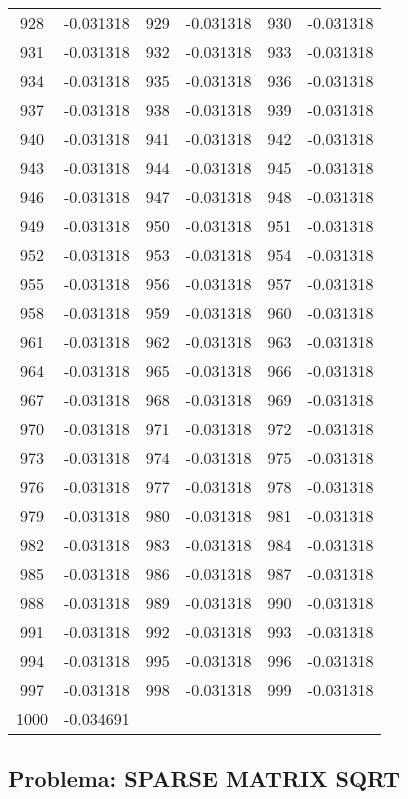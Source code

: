 \documentclass[12pt]{article}
\begin{document}
\begin{longtable}{@{}cc|cc|cc@{}}
928 & -0.031318 & 929 & -0.031318 & 930 & -0.031318 \\
931 & -0.031318 & 932 & -0.031318 & 933 & -0.031318 \\
934 & -0.031318 & 935 & -0.031318 & 936 & -0.031318 \\
937 & -0.031318 & 938 & -0.031318 & 939 & -0.031318 \\
940 & -0.031318 & 941 & -0.031318 & 942 & -0.031318 \\
943 & -0.031318 & 944 & -0.031318 & 945 & -0.031318 \\
946 & -0.031318 & 947 & -0.031318 & 948 & -0.031318 \\
949 & -0.031318 & 950 & -0.031318 & 951 & -0.031318 \\
952 & -0.031318 & 953 & -0.031318 & 954 & -0.031318 \\
955 & -0.031318 & 956 & -0.031318 & 957 & -0.031318 \\
958 & -0.031318 & 959 & -0.031318 & 960 & -0.031318 \\
961 & -0.031318 & 962 & -0.031318 & 963 & -0.031318 \\
964 & -0.031318 & 965 & -0.031318 & 966 & -0.031318 \\
967 & -0.031318 & 968 & -0.031318 & 969 & -0.031318 \\
970 & -0.031318 & 971 & -0.031318 & 972 & -0.031318 \\
973 & -0.031318 & 974 & -0.031318 & 975 & -0.031318 \\
976 & -0.031318 & 977 & -0.031318 & 978 & -0.031318 \\
979 & -0.031318 & 980 & -0.031318 & 981 & -0.031318 \\
982 & -0.031318 & 983 & -0.031318 & 984 & -0.031318 \\
985 & -0.031318 & 986 & -0.031318 & 987 & -0.031318 \\
988 & -0.031318 & 989 & -0.031318 & 990 & -0.031318 \\
991 & -0.031318 & 992 & -0.031318 & 993 & -0.031318 \\
994 & -0.031318 & 995 & -0.031318 & 996 & -0.031318 \\
997 & -0.031318 & 998 & -0.031318 & 999 & -0.031318 \\
1000 & -0.034691 &  &  &  &  \\

\end{longtable}


\newpage            
\subsection{Problema: SPARSE MATRIX SQRT}
\end{document}
